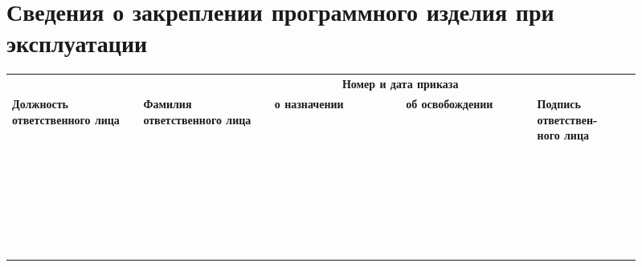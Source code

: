 \documentclass[14pt,a4paper,final]{extreport}
\newlength{\rs}
\begin{document}
\newpage

\chapter{Сведения о закреплении программного изделия при эксплуатации}

\begin{center}
	\small	\begin{longtable}{|p{0.19\linewidth}|p{0.19\linewidth}|p{0.19\linewidth}|p{0.19\linewidth}|p{0.15\linewidth}|}
		
		
		
		\hline
		& & \multicolumn{2}{c|}{\textbf{Номер и дата приказа}} & \\
		\cline{3-4}
		\textbf{Должность ответственного лица}& \textbf{Фамилия ответственного лица} & \textbf{о назначении} & \textbf{об освобождении} & \textbf{Подпись ответствен-\newline ного лица}\\
		
		
		\endfirsthead
		
		
		\endfoot
		\hline
		\endlastfoot
		
		& & & &  \\ \hline
		& & & &  \\ \hline
		& & & &  \\ \hline
		& & & &  \\ \hline
		& & & &  \\ \hline
		& & & &  \\ \hline
		& & & &  \\ \hline
		& & & &  \\ \hline
		& & & &  \\ \hline
		& & & &  \\ \hline
		& & & &  \\ \hline
		& & & &  \\ \hline
		& & & &  \\ \hline
		& & & &  \\ \hline
		& & & &  \\ \hline
		& & & &  \\ \hline
		& & & &  \\ \hline
		& & & &  \\ \hline
		& & & &  \\ \hline
		& & & &  \\ \hline
		& & & &  \\ \hline
		& & & &  \\ \hline
		& & & &  \\ \hline
		& & & &  \\ \hline
		& & & &  \\ \hline
		& & & &  \\ \hline
		
		& &  & & \\ 
		
		
		
		
		
	\end{longtable}
\end{center}
\end{document}
